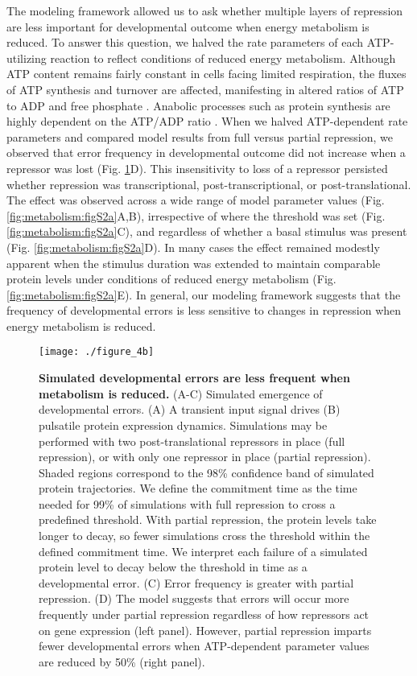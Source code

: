 The modeling framework allowed us to ask whether multiple layers of repression are less important for developmental outcome when energy metabolism is reduced. To answer this question, we halved the rate parameters of each ATP-utilizing reaction to reflect conditions of reduced energy metabolism. Although ATP content remains fairly constant in cells facing limited respiration, the fluxes of ATP synthesis and turnover are affected, manifesting in altered ratios of ATP to ADP and free phosphate \cite{Brown1992}. Anabolic processes such as protein synthesis are highly dependent on the ATP/ADP ratio \cite{Atkinson1977}. When we halved ATP-dependent rate parameters and compared model results from full versus partial repression, we observed that error frequency in developmental outcome did not increase when a repressor was lost (Fig. \ref{fig:metabolism:fig4b}D). This insensitivity to loss of a repressor persisted whether repression was transcriptional, post-transcriptional, or post-translational. The effect was observed across a wide range of model parameter values (Fig. \ref{fig:metabolism:figS2a}A,B), irrespective of where the threshold was set (Fig. \ref{fig:metabolism:figS2a}C), and regardless of whether a basal stimulus was present (Fig. \ref{fig:metabolism:figS2a}D). In many cases the effect remained modestly apparent when the stimulus duration was extended to maintain comparable protein levels under conditions of reduced energy metabolism (Fig. \ref{fig:metabolism:figS2a}E). In general, our modeling framework suggests that the frequency of developmental errors is less sensitive to changes in repression when energy metabolism is reduced.

\begin{figure}[h!]
\centering
\texttt{[image: ./figure\_4b]}
\caption[Simulated developmental errors are less frequent when metabolism is reduced.]{\textbf{Simulated developmental errors are less frequent when metabolism is reduced.} (A-C) Simulated emergence of developmental errors. (A) A transient input signal drives (B) pulsatile protein expression dynamics. Simulations may be performed with two post-translational repressors in place (full repression), or with only one repressor in place (partial repression). Shaded regions correspond to the 98\% confidence band of simulated protein trajectories. We define the commitment time as the time needed for 99\% of simulations with full repression to cross a predefined threshold. With partial repression, the protein levels take longer to decay, so fewer simulations cross the threshold within the defined commitment time. We interpret each failure of a simulated protein level to decay below the threshold in time as a developmental error. (C) Error frequency is greater with partial repression. (D) The model suggests that errors will occur more frequently under partial repression regardless of how repressors act on gene expression (left panel). However, partial repression imparts fewer developmental errors when ATP-dependent parameter values are reduced by 50\% (right panel).}
\label{fig:metabolism:fig4b}
\end{figure}


